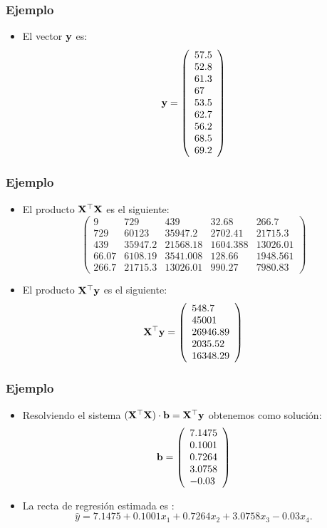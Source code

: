 \begin{frame}
\frametitle{Ejemplo}
\begin{itemize}
\item<2->{El vector $\mathbf{y}$ es:
$$
\mathbf{y}=\left(
\begin{array}{l}
57.5\\ 52.8\\ 61.3\\ 67\\ 53.5\\ 62.7\\ 56.2\\ 68.5\\ 69.2
\end{array}
\right)
$$}
\end{itemize}
\end{frame}
\begin{frame}
\frametitle{Ejemplo}
\begin{itemize}
\item<2->{El producto $\mathbf{X}^\top\mathbf{X}$ es el siguiente:
$$
\left(
\begin{array}{lllll}
9& 729&   439&  32.68 & 266.7 \\
729& 60123& 35947.2& 2702.41& 21715.3\\
439& 35947.2& 21568.18& 1604.388& 13026.01\\
66.07 & 6108.19 & 3541.008& 128.66&  1948.561\\
266.7& 21715.3&13026.01& 990.27&  7980.83
\end{array}
\right)
$$}
\item<3->{El producto $\mathbf{X}^\top\mathbf{y}$ es el siguiente:
$$
\mathbf{X}^\top\mathbf{y} = \left(
\begin{array}{l}
548.7\\ 45001\\ 26946.89\\ 2035.52\\ 16348.29
\end{array}
\right)
$$}
\end{itemize}
\end{frame}
\begin{frame}
\frametitle{Ejemplo}
\begin{itemize}
\item<2->{Resolviendo el sistema $(\mathbf{X}^\top\mathbf{X})\cdot \mathbf{b}=\mathbf{X}^\top \mathbf{y}$ obtenemos como solución:
$$
\mathbf{b}=\left(
\begin{array}{l}
7.1475 \\ 0.1001 \\ 0.7264 \\ 3.0758\\ -0.03
\end{array}
\right)
$$}
\item<3->{La recta de regresión estimada es :
$$\hat{y}=7.1475 +   0.1001 x_1+0.7264 x_2 +3.0758 x_3-0.03 x_4.$$}
\end{itemize}
\end{frame}
